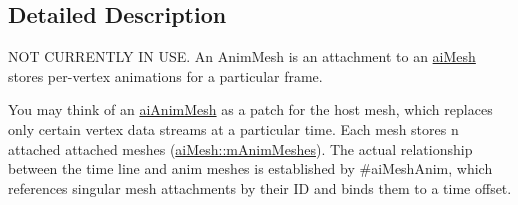 \subsection{Detailed Description}
N\-O\-T C\-U\-R\-R\-E\-N\-T\-L\-Y I\-N U\-S\-E. An Anim\-Mesh is an attachment to an \hyperlink{structai_mesh}{ai\-Mesh} stores per-\/vertex animations for a particular frame. 

You may think of an \hyperlink{structai_anim_mesh}{ai\-Anim\-Mesh} as a {\ttfamily patch} for the host mesh, which replaces only certain vertex data streams at a particular time. Each mesh stores n attached attached meshes (\hyperlink{structai_mesh_a5078f7db7e99ed05db89dfa412f0e990}{ai\-Mesh\-::m\-Anim\-Meshes}). The actual relationship between the time line and anim meshes is established by \#ai\-Mesh\-Anim, which references singular mesh attachments by their I\-D and binds them to a time offset. 

